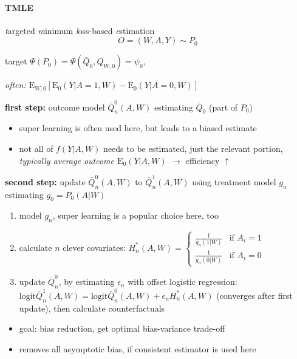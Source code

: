 \documentclass[8pt,oneside]{extarticle}
\begin{document}
\begin{multicols}{2}


\paragraph{\large TMLE} \textit{t}argeted \textit{m}inimum \textit{l}oss-based \textit{e}stimation
$$O=(W, A, Y) \sim P_0$$

\noindent target $\Psi(P_0) = \Psi(\bar{Q}_0, Q_{W,0}) = \psi_0$, 

\textit{often: $\mathrm{E}_{W,0}\left[\mathrm{E}_0(Y|A{=}1,W) {-} \mathrm{E}_0(Y|A{=}0,W)\right]$}

\noindent \textbf{first step:} outcome model $\bar{Q}^0_n(A,W)$ estimating $\bar{Q}_0$ (part of $P_0$)
\begin{itemize}[leftmargin=*, itemsep=0em, topsep=0pt, partopsep=0pt,parsep=0pt]
\setlength{\itemsep}{0pt}%
\setlength{\parskip}{0pt}
\item  super learning is often used here, but leads to a biased estimate
\item not all of $f(Y|A,W)$ needs to be estimated, just the relevant portion, \textit{typically average  outcome $\mathrm{E}_0(Y|A,W)$}  $\rightarrow$ efficiency $\uparrow$
\end{itemize}

\noindent \textbf{second step:} update $\bar{Q}^0_n(A,W)$ to $\bar{Q}^1_n(A,W)$ using treatment model $g_n$ estimating $g_0 = P_0(A|W)$ 
\begin{enumerate}[leftmargin=*, itemsep=0em, topsep=0pt, partopsep=0pt,parsep=0pt]
\setlength{\itemsep}{0pt}%
\setlength{\parskip}{0pt}
\item model $g_n$,  super learning is a popular choice here, too
\item calculate $n$ clever covariates: $H^*_n(A,W) {=} \begin{cases}\frac{1}{g_n(1|W)}  &\text{if } A_i{=}1 \\   \frac{1}{g_n(0|W)}        &\text{if } A_i{=}0 \end{cases}$
\item update $\bar{Q}_n^0$, by estimating $\epsilon_n$ with offset logistic regression: $\mathrm{logit} \bar{Q}_n^1(A,W) = \mathrm{logit} \bar{Q}_n^0(A,W) + \epsilon_n H_n^*(A,W)$ \newline (converges after first update), then calculate counterfactuals
\end{enumerate}
\begin{itemize}[leftmargin=*, itemsep=0em, topsep=0pt, partopsep=0pt,parsep=0pt]
\setlength{\itemsep}{0pt}%
\setlength{\parskip}{0pt}
\item goal: bias reduction, get optimal bias-variance trade-off
\item removes all asymptotic bias, if consistent estimator is used here
\end{itemize}


\end{multicols}
\end{document}
